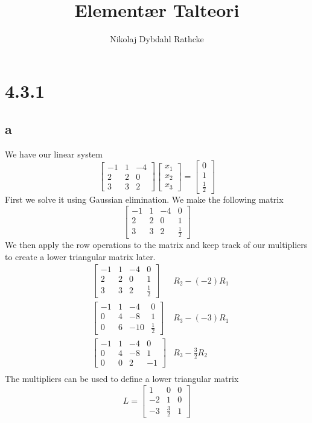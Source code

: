 \documentclass[12pt]{article}
\title{Elementær Talteori}
\author{Nikolaj Dybdahl Rathcke}
\begin{document}
\section*{4.3.1}
\subsection*{a}
We have our linear system
$$
\begin{bmatrix}
-1 & 1 & -4 \\
2 & 2 & 0 \\
3 & 3 & 2
\end{bmatrix}
\begin{bmatrix}
x_1 \\
x_2 \\
x_3
\end{bmatrix}
=
\begin{bmatrix}
0 \\
1 \\
\frac{1}{2}
\end{bmatrix}
$$
First we solve it using Gaussian elimination. We make the following matrix
$$
\begin{bmatrix}
-1 & 1 & -4 & 0\\
2 & 2 & 0 & 1\\
3 & 3 & 2 & \frac{1}{2}
\end{bmatrix}
$$
We then apply the row operations to the matrix and keep track of our multipliers to create a lower triangular matrix later.
\begin{align*}
&\begin{bmatrix}
-1 & 1 & -4 & 0\\
2 & 2 & 0 & 1\\ 
3 & 3 & 2 & \frac{1}{2}
\end{bmatrix}
&R_2-(-2)R_1 \\
&\begin{bmatrix}
-1 & 1 & -4 & 0\\
0 & 4 & -8 & 1\\
0 & 6 & -10 & \frac{1}{2}
\end{bmatrix}
&R_3-(-3)R_1\\
&\begin{bmatrix}
-1 & 1 & -4 & 0\\
0 & 4 & -8 & 1\\
0 & 0 & 2 & -1
\end{bmatrix}
&R_3-\frac{3}{2}R_2\\
\end{align*}
The multipliers can be used to define a lower triangular matrix
$$
L=
\begin{bmatrix}
1 & 0 & 0 \\
-2 & 1 & 0 \\
-3 & \frac{3}{2} & 1
\end{bmatrix}
$$
\end{document}
